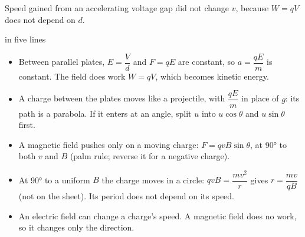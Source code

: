 \begin{experiment}{Speed gained from an accelerating voltage}
{  gap did not change $v$, because $W = qV$ does not depend on $d$.}
\end{experiment}

\begin{summarybox}{ in five lines}
\begin{itemize}
  \item Between parallel plates, $E = \dfrac{V}{d}$ and $F = qE$ are constant, so
        $a = \dfrac{qE}{m}$ is constant. The field does work $W = qV$, which becomes
        kinetic energy.
  \item A charge between the plates moves like a projectile, with $\dfrac{qE}{m}$ in
        place of $g$: its path is a parabola. If it enters at an angle, split $u$ into
        $u\cos\theta$ and $u\sin\theta$ first.
  \item A magnetic field pushes only on a moving charge: $F = qvB\sin\theta$, at
        \ang{90} to both $v$ and $B$ (palm rule; reverse it for a negative charge).
  \item At \ang{90} to a uniform $B$ the charge moves in a circle:
        $qvB = \dfrac{mv^2}{r}$ gives $r = \dfrac{mv}{qB}$ (not on the sheet). Its period
        does not depend on its speed.
  \item An electric field can change a charge's speed. A magnetic field does no work,
        so it changes only the direction.
\end{itemize}
\end{summarybox}

